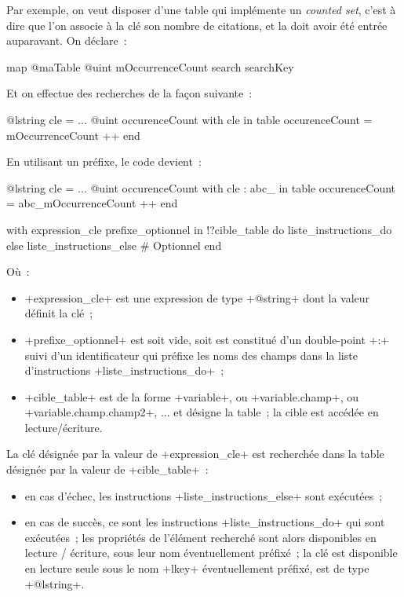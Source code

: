Par exemple, on veut disposer d'une table qui implémente un \emph{counted set}, c'est à dire que l'on associe à la clé son nombre de citations, et la doit avoir été entrée auparavant. On déclare~:
\begin{galgas}
map @maTable {
  @uint mOccurrenceCount
  search searchKey %
}
\end{galgas}

Et on effectue des recherches de la façon suivante~:
\begin{galgas}
@lstring cle = ...
@uint occurenceCount
with cle in table %
  occurenceCount = mOccurrenceCount ++
end
\end{galgas}

En utilisant un préfixe, le code devient~:
\begin{galgas}
@lstring cle = ...
@uint occurenceCount
with cle : abc_ in table %
  occurenceCount = abc_mOccurrenceCount ++
end
\end{galgas}







\begin{galgas}
with expression_cle prefixe_optionnel in !?cible_table
do
  liste_instructions_do
else
  liste_instructions_else # Optionnel
end
\end{galgas}


Où~:
\begin{itemize}
  \item \ggs+expression_cle+ est une expression de type \ggs+@string+ dont la valeur définit la clé~;
  \item \ggs+prefixe_optionnel+ est soit vide, soit est constitué d'un double-point \ggs+:+ suivi d'un identificateur qui préfixe les noms des champs dans la liste d'instructions \ggs+liste_instructions_do+~;
  \item \ggs+cible_table+ est de la forme \ggs+variable+, ou  \ggs+variable.champ+, ou \ggs+variable.champ.champ2+, ... et désigne la table~; la cible est accédée en lecture/écriture.
\end{itemize}

La clé désignée par la valeur de \ggs+expression_cle+ est recherchée dans la table désignée par la valeur de \ggs+cible_table+~:
\begin{itemize}
  \item en cas d'échec, les instructions \ggs+liste_instructions_else+ sont exécutées~;
  \item en cas de succès, ce sont les instructions \ggs+liste_instructions_do+ qui sont exécutées~; les propriétés de l'élément recherché sont alors disponibles en lecture / écriture, sous leur nom éventuellement préfixé~; la clé est disponible en lecture seule sous le nom \ggs+lkey+ éventuellement préfixé, est de type \ggs+@lstring+.
\end{itemize}

